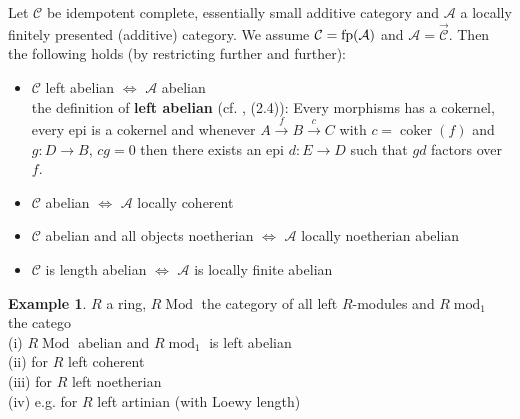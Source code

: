 \documentclass[11pt,a4paper]{amsart}
\theoremstyle{plain}
\theoremstyle{definition}
\newtheorem{exa}[thm]{Example}
\DeclareMathOperator{\modu}{mod}
\DeclareMathOperator{\Modu}{Mod}
\DeclareMathOperator{\coKer}{coker}
\newcommand{\mcA}{\mathcal{A}}
\newcommand{\mcC}{\mathcal{C}}
\newcommand{\mcO}{\mathcal{O}}
\begin{document}
Let $\mcC$ be idempotent complete, essentially small additive category and $\mcA$ a locally finitely presented (additive) category. 
We assume $\mcC={\rm fp} (\mcA)$ and $\mcA= \overrightarrow{\mcC}$. 
Then the following holds (by restricting further and further): 
\begin{itemize}
\item[(i)] $\mcC$ left abelian $ \Leftrightarrow$ $\mcA$ abelian\\
the definition of \textbf{left abelian} (cf. \cite{CB}, (2.4)): Every morphisms has a cokernel, every epi is a cokernel and whenever $A\xrightarrow{f} B \xrightarrow{c} C$ with $c=\coKer (f)$ and $g\colon D\to B$, $cg=0$ then there exists an epi $d\colon E\to D$ such that $gd$ factors over $f$. 
\item[(ii)] $\mcC$ abelian $ \Leftrightarrow$ $\mcA$ locally coherent
\item[(iii)] $\mcC$ abelian and all objects noetherian $\Leftrightarrow$ $\mcA$ locally noetherian abelian
\item[(iv)] $\mcC$ is length abelian $\Leftrightarrow$ $\mcA$ is locally finite abelian
\end{itemize}

\begin{exa}
$R$ a ring, $R\Modu$ the category of all left $R$-modules and $R\modu_1$ the catego\\
(i) $R\Modu $ abelian and $R\modu _1$ is left abelian\\
(ii) for $R$ left coherent\\
(iii) for $R$ left noetherian\\
(iv) e.g. for $R$ left artinian (with Loewy length)
\end{exa}

\end{document}

